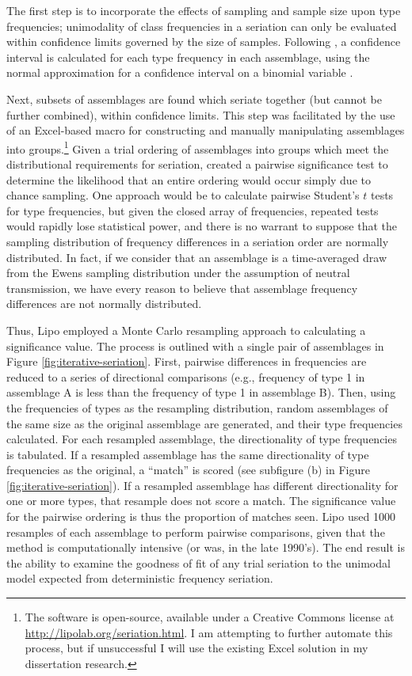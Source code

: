 The first step is to incorporate the effects of sampling and sample size upon type frequencies; unimodality of class frequencies in a seriation can only be evaluated within confidence limits governed by the size of samples.  Following \citet{Beals1945}, a confidence interval is calculated for each type frequency in each assemblage, using the normal approximation for a confidence interval on a binomial variable \citep{cochran2007sampling}.

Next, subsets of assemblages are found which seriate together (but cannot be further combined), within confidence limits.  This step was facilitated by the use of an Excel-based macro for constructing and manually manipulating assemblages into groups.\footnote{The software is open-source, available under a Creative Commons license at \url{http://lipolab.org/seriation.html}.  I am attempting to further automate this process, but if unsuccessful I will use the existing Excel solution in my dissertation research.}  Given a trial ordering of assemblages into groups which meet the distributional requirements for seriation, \citet{Lipo2001b} created a pairwise significance test to determine the likelihood that an entire ordering would occur simply due to chance sampling.  One approach would be to calculate pairwise Student's $t$ tests for type frequencies, but given the closed array of frequencies, repeated tests would rapidly lose statistical power, and there is no warrant to suppose that the sampling distribution of frequency differences in a seriation order are normally distributed.  In fact, if we consider that an assemblage is a time-averaged draw from the Ewens sampling distribution under the assumption of neutral transmission, we have every reason to believe that assemblage frequency differences are not normally distributed.  



Thus, Lipo employed a Monte Carlo resampling approach to calculating a significance value.  The process is outlined with a single pair of assemblages in Figure \ref{fig:iterative-seriation}.  First, pairwise differences in frequencies are reduced to a series of directional comparisons (e.g., frequency of type 1 in assemblage A is less than the frequency of type 1 in assemblage B).  Then, using the frequencies of types as the resampling distribution, random assemblages of the same size as the original assemblage are generated, and their type frequencies calculated.  For each resampled assemblage, the directionality of type frequencies is tabulated.  If a resampled assemblage has the same directionality of type frequencies as the original, a ``match'' is scored (see subfigure (b) in Figure \ref{fig:iterative-seriation}).  If a resampled assemblage has different directionality for one or more types, that resample does not score a match.  The significance value for the pairwise ordering is thus the proportion of matches seen.  Lipo used 1000 resamples of each assemblage to perform pairwise comparisons, given that the method is computationally intensive (or was, in the late 1990's).  The end result is the ability to examine the goodness of fit of any trial seriation to the unimodal model expected from deterministic frequency seriation.  

